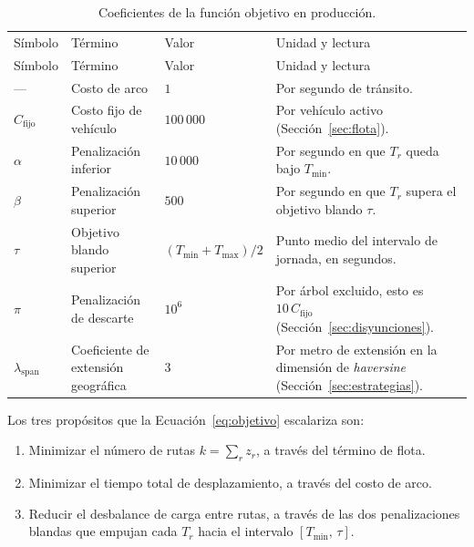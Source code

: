 \begin{enumerate}
\small
\begin{xltabular}{\textwidth}{@{}l p{2.2cm} l X@{}}
  \caption{Coeficientes de la función objetivo en producción.}
  \label{tab:coeficientes} \\
  \addlinespace
  \toprule
  Símbolo & Término & Valor & Unidad y lectura \\
  \addlinespace
  \midrule
  \endfirsthead
  \toprule
  Símbolo & Término & Valor & Unidad y lectura \\
  \addlinespace
  \midrule
  \endhead
  \bottomrule
  \endlastfoot
    --- &
      Costo de arco &
      $1$ &
      Por segundo de tránsito. \\
      \addlinespace
    $C_{\text{fijo}}$ &
      Costo fijo de vehículo &
      $100\,000$ &
      Por vehículo activo (Sección~\ref{sec:flota}). \\
      \addlinespace
    $\alpha$ &
      Penalización inferior &
      $10\,000$ &
      Por segundo en que $T_r$ queda bajo $T_{\min}$. \\
      \addlinespace
    $\beta$ &
      Penalización superior &
      $500$ &
      Por segundo en que $T_r$ supera el objetivo blando $\tau$. \\
      \addlinespace
    $\tau$ &
      Objetivo blando superior &
      $(T_{\min}+T_{\max})/2$ &
      Punto medio del intervalo de jornada, en segundos. \\
      \addlinespace
    $\pi$ &
      Penalización de descarte &
      $10^{6}$ &
      Por árbol excluido, esto es $10\,C_{\text{fijo}}$ (Sección~\ref{sec:disyunciones}). \\
      \addlinespace
    $\lambda_{\text{span}}$ &
      Coeficiente de extensión geográfica &
      $3$ &
      Por metro de extensión en la dimensión de \textit{haversine}
      (Sección~\ref{sec:estrategias}). \\
\end{xltabular}
\normalsize

Los tres propósitos que la Ecuación~\ref{eq:objetivo} escalariza son:

\begin{enumerate}
  \item Minimizar el número de rutas $k = \sum_r z_r$, a través del término de flota.
  \item Minimizar el tiempo total de desplazamiento, a través del costo de arco.
  \item Reducir el desbalance de carga entre rutas, a través de las dos penalizaciones blandas que
        empujan cada $T_r$ hacia el intervalo $[T_{\min},\,\tau]$.
\end{enumerate}


\end{enumerate}

